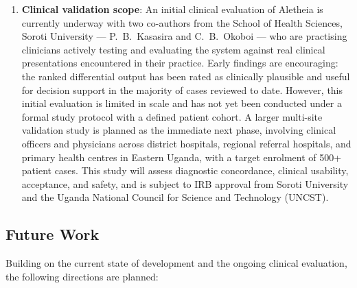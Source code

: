 \documentclass[journal]{IEEEtran}
\begin{document}
\begin{enumerate}
  \item \textbf{Clinical validation scope}: An initial clinical
        evaluation of Aletheia is currently underway with two
        co-authors from the School of Health Sciences, Soroti
        University --- P.~B.~Kasasira and C.~B.~Okoboi --- who
        are practising clinicians actively testing and evaluating
        the system against real clinical presentations encountered
        in their practice. Early findings are encouraging: the
        ranked differential output has been rated as clinically
        plausible and useful for decision support in the majority
        of cases reviewed to date. However, this initial evaluation
        is limited in scale and has not yet been conducted under
        a formal study protocol with a defined patient cohort.
        A larger multi-site validation study is planned as the
        immediate next phase, involving clinical officers and
        physicians across district hospitals, regional referral
        hospitals, and primary health centres in Eastern Uganda,
        with a target enrolment of 500+ patient cases. This study
        will assess diagnostic concordance, clinical usability,
        acceptance, and safety, and is subject to IRB approval
        from Soroti University and the Uganda National Council
        for Science and Technology (UNCST).
\end{enumerate}

\subsection{Future Work}

Building on the current state of development and the ongoing
clinical evaluation, the following directions are planned:
\end{document}
